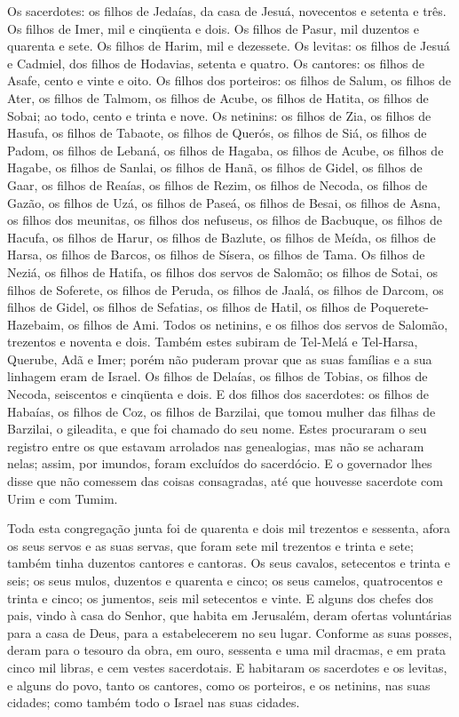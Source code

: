 Os sacerdotes: os filhos de Jedaías, da casa de Jesuá, novecentos
e setenta e três. Os filhos de Imer, mil e cinqüenta e dois.
Os filhos de Pasur, mil duzentos e quarenta e sete. Os
filhos de Harim, mil e dezessete. Os levitas: os filhos de
Jesuá e Cadmiel, dos filhos de Hodavias, setenta e quatro. Os
cantores: os filhos de Asafe, cento e vinte e oito. Os filhos
dos porteiros: os filhos de Salum, os filhos de Ater, os filhos de
Talmom, os filhos de Acube, os filhos de Hatita, os filhos de Sobai;
ao todo, cento e trinta e nove. Os netinins: os filhos de
Zia, os filhos de Hasufa, os filhos de Tabaote, os filhos de
Querós, os filhos de Siá, os filhos de Padom, os filhos de
Lebaná, os filhos de Hagaba, os filhos de Acube, os filhos de
Hagabe, os filhos de Sanlai, os filhos de Hanã, os filhos de
Gidel, os filhos de Gaar, os filhos de Reaías, os filhos de
Rezim, os filhos de Necoda, os filhos de Gazão, os filhos de
Uzá, os filhos de Paseá, os filhos de Besai, os filhos de
Asna, os filhos dos meunitas, os filhos dos nefuseus, os
filhos de Bacbuque, os filhos de Hacufa, os filhos de Harur,
os filhos de Bazlute, os filhos de Meída, os filhos de Harsa,
os filhos de Barcos, os filhos de Sísera, os filhos de Tama.
Os filhos de Neziá, os filhos de Hatifa, os filhos dos
servos de Salomão; os filhos de Sotai, os filhos de Soferete, os
filhos de Peruda, os filhos de Jaalá, os filhos de Darcom, os
filhos de Gidel, os filhos de Sefatias, os filhos de Hatil,
os filhos de Poquerete-Hazebaim, os filhos de Ami. Todos os
netinins, e os filhos dos servos de Salomão, trezentos e noventa e
dois. Também estes subiram de Tel-Melá e Tel-Harsa, Querube,
Adã e Imer; porém não puderam provar que as suas famílias e a sua
linhagem eram de Israel. Os filhos de Delaías, os filhos de
Tobias, os filhos de Necoda, seiscentos e cinqüenta e dois. E
dos filhos dos sacerdotes: os filhos de Habaías, os filhos de Coz,
os filhos de Barzilai, que tomou mulher das filhas de Barzilai, o
gileadita, e que foi chamado do seu nome. Estes procuraram o
seu registro entre os que estavam arrolados nas genealogias, mas não
se acharam nelas; assim, por imundos, foram excluídos do sacerdócio.
E o governador lhes disse que não comessem das coisas
consagradas, até que houvesse sacerdote com Urim e com Tumim.

Toda esta congregação junta foi de quarenta e dois mil trezentos
e sessenta, afora os seus servos e as suas servas, que foram
sete mil trezentos e trinta e sete; também tinha duzentos cantores e
cantoras. Os seus cavalos, setecentos e trinta e seis; os
seus mulos, duzentos e quarenta e cinco; os seus camelos,
quatrocentos e trinta e cinco; os jumentos, seis mil setecentos e
vinte. E alguns dos chefes dos pais, vindo à casa do Senhor,
que habita em Jerusalém, deram ofertas voluntárias para a casa de
Deus, para a estabelecerem no seu lugar. Conforme as suas
posses, deram para o tesouro da obra, em ouro, sessenta e uma mil
dracmas, e em prata cinco mil libras, e cem vestes sacerdotais.
E habitaram os sacerdotes e os levitas, e alguns do povo,
tanto os cantores, como os porteiros, e os netinins, nas suas
cidades; como também todo o Israel nas suas cidades.

